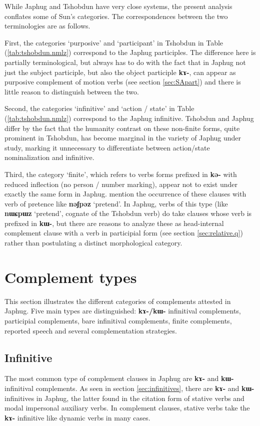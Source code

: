 \documentclass[oneside,a4paper,11pt]{article}
\newcommand{\ipa}[1]{\textbf{\phon#1}} %
\newcommand{\jpg}[2]{\ipa{#1} `#2'} %
\begin{document}
While Japhug and Tshobdun have very close systems, the present analysis conflates some of Sun's categories. The correspondences between the two terminologies are as follows.

First, the categories `purposive' and `participant' in Tshobdun in Table (\ref{tab:tshobdun.nmlz}) correspond to the Japhug participles. The difference here is partially terminological, but always has to do with the fact that in Japhug not just the subject participle, but also the object participle \ipa{kɤ-}, can appear as purposive complement of motion verbs (see section \ref{sec:SApart}) and there is little reason to distinguish between the two.

Second, the categories `infinitive' and `action / state' in Table (\ref{tab:tshobdun.nmlz}) correspond to the Japhug infinitive. Tshobdun and Japhug differ by the fact that the humanity contrast on these non-finite forms, quite prominent in Tshobdun, has become marginal in the variety of Japhug under study, marking it unnecessary to differentiate between action/state nominalization and infinitive.

Third, the category `finite', which refers to verbs forms prefixed in \ipa{kə-} with reduced inflection (no person / number marking), appear not to exist under exactly the same form in Japhug. \citet[481]{sun12complementation} mention the occurrence of these clauses with verb of pretence like \jpg{nəʃpəz}{pretend}. In Japhug, verbs of this type (like \jpg{nɯɕpɯz}{pretend}, cognate of the Tshobdun verb) do take clauses whose verb is prefixed in \ipa{kɯ-}, but there are reasons to analyze these as head-internal complement clause with a verb in participial form (see section \ref{sec:relative.q}) rather than postulating a distinct morphological category.


 
\section{Complement types} \label{sec:complement.types}
This section illustrates the different categories of complements attested in Japhug. Five main types are distinguished: \ipa{kɤ-/kɯ-} infinitival complements, participial complements, bare infinitival complements, finite complements, reported speech and several complementation strategies.

\subsection{Infinitive} \label{sec:infinitives.compl}
The most common type of complement clauses in Japhug are \ipa{kɤ-} and \ipa{kɯ-} infinitival complements. As seen in section \ref{sec:infinitives}, there are \ipa{kɤ-} and \ipa{kɯ-} infinitives in Japhug, the latter found in the citation form of stative verbs and modal impersonal auxiliary verbs. In complement clauses, stative verbs take the \ipa{kɤ-} infinitive like dynamic verbs in many cases.
\end{document}

